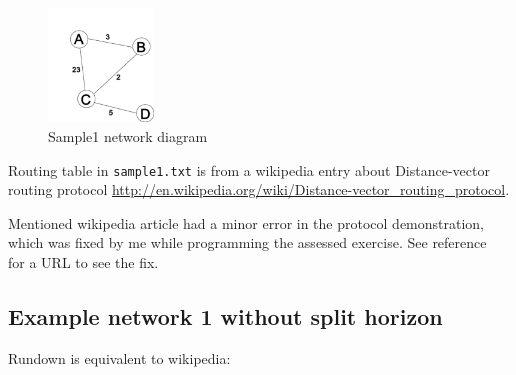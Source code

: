 \documentclass[english,11pt]{article}
\begin{document}
\begin{figure}
    \label{img:sample1.png}
    \begin{center}
        \includegraphics[width=0.25\textwidth]{sample1}
    \end{center}
    \caption{Sample1 network diagram}
\end{figure}

Routing table in \texttt{sample1.txt} is from a wikipedia entry about
Distance-vector routing protocol
\url{http://en.wikipedia.org/wiki/Distance-vector_routing_protocol}.

Mentioned wikipedia article had a minor error in the protocol demonstration,
which was fixed by me while programming the assessed exercise. See
reference~\cite{wpdiff} for a URL to see the fix.

\subsection{Example network 1 without split horizon}

Rundown is equivalent to wikipedia:
\end{document}
